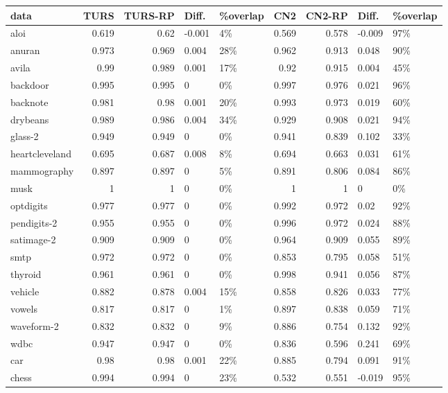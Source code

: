 \begin{table}[ht]
\centering
\small
\begin{tabular}{l|rrll|rrll}
  \hline
data & TURS & TURS-RP & Diff. & \%overlap & CN2 & CN2-RP & Diff. & \%overlap \\ 
  \hline
aloi & 0.619 & 0.62 & -0.001 & 4\% & 0.569 & 0.578 & -0.009 & 97\% \\ 
  anuran & 0.973 & 0.969 & 0.004 & 28\% & 0.962 & 0.913 & 0.048 & 90\% \\ 
  avila & 0.99 & 0.989 & 0.001 & 17\% & 0.92 & 0.915 & 0.004 & 45\% \\ 
  backdoor & 0.995 & 0.995 & 0 & 0\% & 0.997 & 0.976 & 0.021 & 96\% \\ 
  backnote & 0.981 & 0.98 & 0.001 & 20\% & 0.993 & 0.973 & 0.019 & 60\% \\ 
  drybeans & 0.989 & 0.986 & 0.004 & 34\% & 0.929 & 0.908 & 0.021 & 94\% \\ 
  glass-2 & 0.949 & 0.949 & 0 & 0\% & 0.941 & 0.839 & 0.102 & 33\% \\ 
  heartcleveland & 0.695 & 0.687 & 0.008 & 8\% & 0.694 & 0.663 & 0.031 & 61\% \\ 
  mammography & 0.897 & 0.897 & 0 & 5\% & 0.891 & 0.806 & 0.084 & 86\% \\ 
  musk & 1 & 1 & 0 & 0\% & 1 & 1 & 0 & 0\% \\ 
  optdigits & 0.977 & 0.977 & 0 & 0\% & 0.992 & 0.972 & 0.02 & 92\% \\ 
  pendigits-2 & 0.955 & 0.955 & 0 & 0\% & 0.996 & 0.972 & 0.024 & 88\% \\ 
  satimage-2 & 0.909 & 0.909 & 0 & 0\% & 0.964 & 0.909 & 0.055 & 89\% \\ 
  smtp & 0.972 & 0.972 & 0 & 0\% & 0.853 & 0.795 & 0.058 & 51\% \\ 
  thyroid & 0.961 & 0.961 & 0 & 0\% & 0.998 & 0.941 & 0.056 & 87\% \\ 
  vehicle & 0.882 & 0.878 & 0.004 & 15\% & 0.858 & 0.826 & 0.033 & 77\% \\ 
  vowels & 0.817 & 0.817 & 0 & 1\% & 0.897 & 0.838 & 0.059 & 71\% \\ 
  waveform-2 & 0.832 & 0.832 & 0 & 9\% & 0.886 & 0.754 & 0.132 & 92\% \\ 
  wdbc & 0.947 & 0.947 & 0 & 0\% & 0.836 & 0.596 & 0.241 & 69\% \\ 
  car & 0.98 & 0.98 & 0.001 & 22\% & 0.885 & 0.794 & 0.091 & 91\% \\ 
  chess & 0.994 & 0.994 & 0 & 23\% & 0.532 & 0.551 & -0.019 & 95\% \\ 

\end{tabular}
\end{table}
